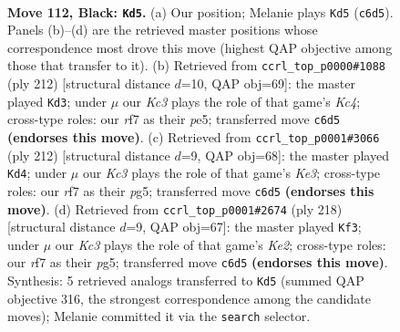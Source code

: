 \documentclass[11pt]{article}
\begin{document}
\clearpage

\begin{figure}[p]\centering
\begin{subfigure}{0.46\textwidth}\centering
\resizebox{\linewidth}{!}{%
\newchessgame
\chessboard[
  setfen={8/5R2/2k5/6K1/3N2P1/7r/8/8 b - - 8 112},
  showmover=false,
  pgfstyle=straightmove, color=movearrow, markmove={c6-d5}
]}
\caption{}
\end{subfigure}\hfill
\begin{subfigure}{0.46\textwidth}\centering
\resizebox{\linewidth}{!}{%
\newchessgame
\chessboard[
  setfen={5R2/8/4k3/4p3/2K5/4nP2/8/8 w - - 15 107},
  showmover=false,
  pgfstyle=straightmove, color=movearrow, markmove={c4-d3}
]}
\caption{}
\end{subfigure}
\\[4pt]
\begin{subfigure}{0.46\textwidth}\centering
\resizebox{\linewidth}{!}{%
\newchessgame
\chessboard[
  setfen={8/8/2R4P/3n1kp1/8/4K3/8/8 w - - 65 107},
  showmover=false,
  pgfstyle=straightmove, color=movearrow, markmove={e3-d4}
]}
\caption{}
\end{subfigure}\hfill
\begin{subfigure}{0.46\textwidth}\centering
\resizebox{\linewidth}{!}{%
\newchessgame
\chessboard[
  setfen={8/8/R7/5kp1/8/6nP/4K3/8 w - - 47 110},
  showmover=false,
  pgfstyle=straightmove, color=movearrow, markmove={e2-f3}
]}
\caption{}
\end{subfigure}
\caption{\textbf{Move 112, Black: \texttt{Kd5}.} (a) Our position; Melanie plays \texttt{Kd5} (\texttt{c6d5}). Panels (b)--(d) are the retrieved master positions whose correspondence most drove this move (highest QAP objective among those that transfer to it). (b) Retrieved from \texttt{ccrl\_top\_p0000\#1088} (ply 212) [structural distance $d$=10, QAP obj=69]: the master played \texttt{Kd3}; under $\mu$ our \emph{Kc3} plays the role of that game's \emph{Kc4}; cross-type roles: our \emph{r}f7 as their \emph{p}e5; transferred move \texttt{c6d5} \textbf{(endorses this move)}. (c) Retrieved from \texttt{ccrl\_top\_p0001\#3066} (ply 212) [structural distance $d$=9, QAP obj=68]: the master played \texttt{Kd4}; under $\mu$ our \emph{Kc3} plays the role of that game's \emph{Ke3}; cross-type roles: our \emph{r}f7 as their \emph{p}g5; transferred move \texttt{c6d5} \textbf{(endorses this move)}. (d) Retrieved from \texttt{ccrl\_top\_p0001\#2674} (ply 218) [structural distance $d$=9, QAP obj=67]: the master played \texttt{Kf3}; under $\mu$ our \emph{Kc3} plays the role of that game's \emph{Ke2}; cross-type roles: our \emph{r}f7 as their \emph{p}g5; transferred move \texttt{c6d5} \textbf{(endorses this move)}. Synthesis: 5 retrieved analogs transferred to \texttt{Kd5} (summed QAP objective 316, the strongest correspondence among the candidate moves); Melanie committed it via the \texttt{search} selector.}
\label{fig:thought-m223}
\end{figure}
\end{document}
